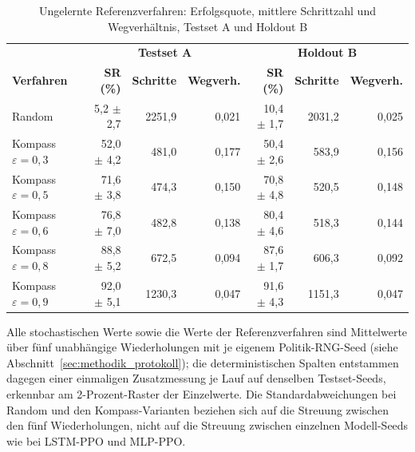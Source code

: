 \documentclass[
  a4paper,
  11pt,
  twoside,
  BCOR=8mm,           %
  headings=big,
  numbers=noenddot,
  listof=totoc,       %
  captions=tableheading,
]{scrreprt}
\begin{document}
\begin{table}[H]
    \centering
    \small
    \caption{Ungelernte Referenzverfahren: Erfolgsquote, mittlere Schrittzahl und Wegverhältnis, Testset A und Holdout B}
    \label{tab:rohdaten_referenz}
    \begin{tabular}{lrrrrrr}
        \toprule
        & \multicolumn{3}{c}{\textbf{Testset A}} & \multicolumn{3}{c}{\textbf{Holdout B}} \\
        \textbf{Verfahren} & \textbf{SR (\%)} & \textbf{Schritte} & \textbf{Wegverh.} & \textbf{SR (\%)} & \textbf{Schritte} & \textbf{Wegverh.} \\
        \midrule
        Random & 5,2 $\pm$ 2,7 & 2251,9 & 0,021 & 10,4 $\pm$ 1,7 & 2031,2 & 0,025 \\
        Kompass $\varepsilon=0{,}3$ & 52,0 $\pm$ 4,2 & 481,0 & 0,177 & 50,4 $\pm$ 2,6 & 583,9 & 0,156 \\
        Kompass $\varepsilon=0{,}5$ & 71,6 $\pm$ 3,8 & 474,3 & 0,150 & 70,8 $\pm$ 4,8 & 520,5 & 0,148 \\
        Kompass $\varepsilon=0{,}6$ & 76,8 $\pm$ 7,0 & 482,8 & 0,138 & 80,4 $\pm$ 4,6 & 518,3 & 0,144 \\
        Kompass $\varepsilon=0{,}8$ & 88,8 $\pm$ 5,2 & 672,5 & 0,094 & 87,6 $\pm$ 1,7 & 606,3 & 0,092 \\
        Kompass $\varepsilon=0{,}9$ & 92,0 $\pm$ 5,1 & 1230,3 & 0,047 & 91,6 $\pm$ 4,3 & 1151,3 & 0,047 \\
        \bottomrule
    \end{tabular}
\end{table}

Alle stochastischen Werte sowie die Werte der Referenzverfahren sind Mittelwerte über fünf unabhängige Wiederholungen mit je eigenem Politik-RNG-Seed (siehe Abschnitt~\ref{sec:methodik_protokoll}); die deterministischen Spalten entstammen dagegen einer einmaligen Zusatzmessung je Lauf auf denselben Testset-Seeds, erkennbar am 2-Prozent-Raster der Einzelwerte. Die Standardabweichungen bei Random und den Kompass-Varianten beziehen sich auf die Streuung zwischen den fünf Wiederholungen, nicht auf die Streuung zwischen einzelnen Modell-Seeds wie bei LSTM-PPO und MLP-PPO.
\end{document}
